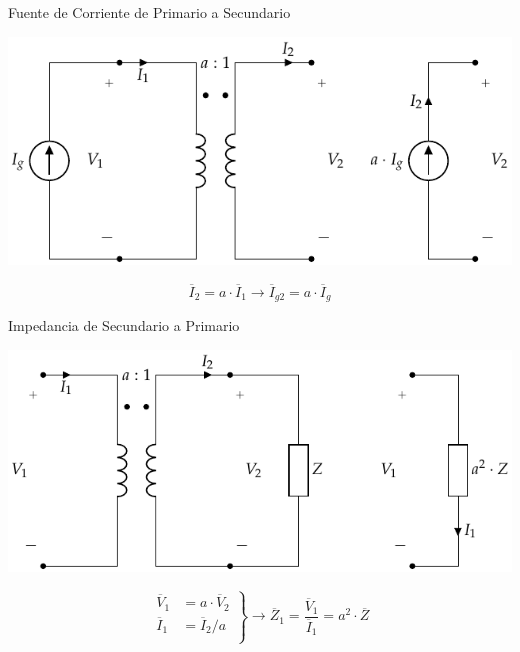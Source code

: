 \documentclass[xcolor={usenames,svgnames,dvipsnames}]{beamer}
\begin{document}
\begin{frame}[label={sec:org1140e9c}]{Fuente de Corriente de Primario a Secundario}
\begin{center}
\includegraphics[width=.9\linewidth]{../figs/TrafoIdeal_IPrim.pdf}
\end{center}

\[
  \overline{I}_2 = a \cdot \overline{I}_1 \rightarrow \boxed{\overline{I}_{g2} = a \cdot \overline{I}_g}
\]
\end{frame}
\begin{frame}[label={sec:org6a81459}]{Impedancia de Secundario a Primario}
\begin{center}
\includegraphics[width=.9\linewidth]{../figs/TrafoIdeal_ZSec.pdf}
\end{center}

\[
  \left.
    \begin{array}{ll}
    \overline{V}_1 &= a \cdot \overline{V}_2\\
    \overline{I}_1 &= \overline{I}_2 / a\\
  \end{array}\right\}
   \rightarrow \boxed{\overline{Z}_1 = \frac{\overline{V}_1}{\overline{I}_1} = a^2 \cdot \overline{Z}} 
\]
\end{frame}
\end{document}
